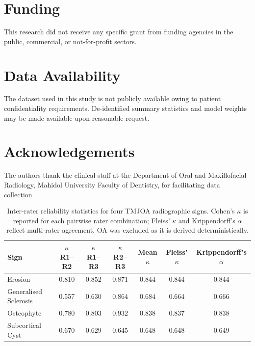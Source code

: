 \documentclass[review,12pt]{elsarticle}
\begin{document}
\section*{Funding}
This research did not receive any specific grant from funding agencies
in the public, commercial, or not-for-profit sectors.

\section*{Data Availability}
The dataset used in this study is not publicly available owing to
patient confidentiality requirements. De-identified summary statistics
and model weights may be made available upon reasonable request.

\section*{Acknowledgements}
The authors thank the clinical staff at the Department of Oral and
Maxillofacial Radiology, Mahidol University Faculty of Dentistry, for
facilitating data collection.


\clearpage

\begin{table}[htbp]
\centering
\caption{Inter-rater reliability statistics for four TMJOA radiographic
signs. Cohen's $\kappa$ is reported for each pairwise rater combination;
Fleiss' $\kappa$ and Krippendorff's $\alpha$ reflect multi-rater
agreement. OA was excluded as it is derived deterministically.}
\label{tab:irr}
\small
\begin{tabular}{lcccccc}
\toprule
\textbf{Sign} &
\textbf{$\kappa$ R1–R2} &
\textbf{$\kappa$ R1–R3} &
\textbf{$\kappa$ R2–R3} &
\textbf{Mean $\kappa$} &
\textbf{Fleiss' $\kappa$} &
\textbf{Krippendorff's $\alpha$} \\
\midrule
Erosion            & 0.810 & 0.852 & 0.871 & 0.844 & 0.844 & 0.844 \\
Generalised Sclerosis & 0.557 & 0.630 & 0.864 & 0.684 & 0.664 & 0.666 \\
Osteophyte         & 0.780 & 0.803 & 0.932 & 0.838 & 0.837 & 0.838 \\
Subcortical Cyst   & 0.670 & 0.629 & 0.645 & 0.648 & 0.648 & 0.649 \\
\bottomrule
\end{tabular}
\end{table}
\end{document}

